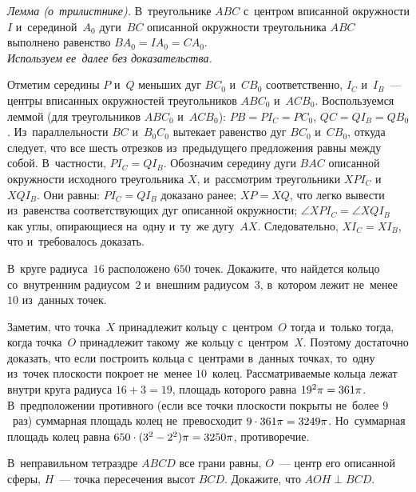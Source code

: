 \ifincludesolutions
\emph{Лемма (о~трилистнике).}
В~треугольнике $ABC$ с~центром вписанной окружности $I$ и~серединой~$A_0$
дуги~$BC$ описанной окружности треугольника $ABC$ выполнено равенство
$B A_0 = I A_0 = C A_0$.
\\
\emph{Используем ее~далее без доказательства.}
\par
Отметим середины $P$ и~$Q$ меньших дуг $B C_0$ и~$C B_0$ соответственно,
$I_C$ и~$I_B$~--- центры вписанных окружностей треугольников
$A B C_0$ и~$A C B_0$.
Воспользуемся леммой (для треугольников $A B C_0$ и~$A C B_0$):
$P B = P I_C = P C_0$, $Q C = Q I_B = Q B_0$.
Из~параллельности $BC$ и~$B_0 C_0$ вытекает равенство дуг $B C_0$ и~$C B_0$,
откуда следует, что все шесть отрезков из~предыдущего предложения равны между
собой.
В~частности, $P I_C = Q I_B$.
Обозначим середину дуги $BAC$ описанной окружности исходного треугольника $X$,
и~рассмотрим треугольники $X P I_C$ и~$X Q I_B$.
Они равны: $P I_C = Q I_B$ доказано ранее; $XP = XQ$, что легко вывести
из~равенства соответствующих дуг описанной окружности;
$\angle X P I_C = \angle X Q I_B$ как углы, опирающиеся на~одну и~ту~же
дугу~$AX$.
Следовательно, $X I_C = X I_B$, что и~требовалось доказать.
\fi %

\begin{problems}

\item
В~круге радиуса~$16$ расположено $650$ точек.
Докажите, что найдется кольцо со~внутренним радиусом~$2$ и~внешним
радиусом~$3$, в~котором лежит не~менее $10$ из~данных точек.

\end{problems}

\ifincludesolutions
Заметим, что точка~$X$ принадлежит кольцу с~центром~$O$ тогда и~только тогда,
когда точка~$O$ принадлежит такому~же кольцу с~центром~$X$.
Поэтому достаточно доказать, что если построить кольца с~центрами в~данных
точках, то~одну из~точек плоскости покроет не~менее $10$~колец.
Рассматриваемые кольца лежат внутри круга радиуса $16 + 3 = 19$, площадь
которого равна $19^2 \mathrm{\pi} = 361 \mathrm{\pi}$.
В~предположении противного (если все точки плоскости покрыты не~более $9$~раз)
суммарная площадь колец не~превосходит
$9 \cdot 361 \mathrm{\pi} = 3249 \mathrm{\pi}$.
Но~суммарная площадь колец равна
$650 \cdot (3^2 - 2^2) \mathrm{\pi} = 3250 \mathrm{\pi}$, противоречие.
\fi %

\begin{problems}

\item
В~неправильном тетраэдре $ABCD$ все грани равны, $O$~--- центр его описанной
сферы, $H$~--- точка пересечения высот $BCD$.
Докажите, что $AOH \perp BCD$.

\end{problems}

